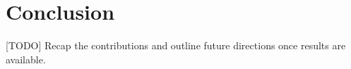 \section{Conclusion}
\label{sec:conclusion}

[TODO] Recap the contributions and outline future directions once results are available.
